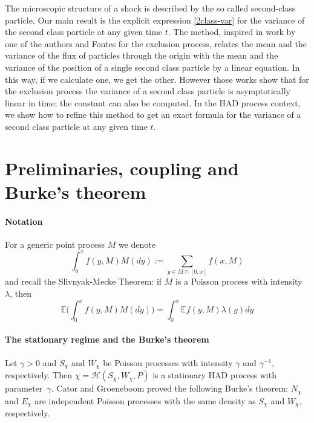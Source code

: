 \documentclass[reqno, 12pt]{amsart}
\begin{document}
The microscopic structure of a shock is described by the so called second-class
particle.  Our main result is the explicit expression \eqref{2class-var} for the
variance of the second class particle at any given time $t$. The method,
inspired in work by one of the authors and Fontes \cite{f,ff} for the exclusion
process, relates the mean and the variance of the flux of particles through the
origin with the mean and the variance of the position of a single second class
particle by a linear equation. In this way, if we calculate one, we get the
other. However those works show that for the exclusion process the variance of a
second class particle is asymptotically linear in time; the constant can also be
computed. In the HAD process context, we show how to refine this method to get
an exact formula for the variance of a second class particle at any given time
$t$.

\section{Preliminaries, coupling and Burke's theorem}
\label{preliminaries}

\paragraph{\bf Notation} For a generic point process $M$ we denote
\begin{equation}
  \label{z1}
  \int_0^x f(y,M) M(dy):= \sum_{y\in M\cap[0,x]} f(x,M)
\end{equation}
and recall the Slivnyak-Mecke Theorem: if $M$ is a Poisson process with
intensity $\lambda$, then
\begin{equation}
  \label{z2}
  {{\mathbb E}} \Big(\int_0^x f(y,M) M(dy)\Big)= \int_0^x {{\mathbb E}} f(y,M) \lambda(y) dy
\end{equation}

\paragraph{\bf The stationary regime and the Burke's theorem} Let $\gamma>0$ and
$S_\chi$ and $W_\chi$ be Poisson processes with intensity $\gamma$ and
$\gamma^{-1}$, respectively. Then $\chi={\mathcal H}(S_\chi,W_\chi,P)$ is a
stationary HAD process with parameter~$\gamma$. Cator and Groeneboom \cite{cg}
proved the following Burke's theorem: $N_\chi$ and $E_\chi$ are independent
Poisson processes with the same density as $S_\chi$ and $W_\chi$, respectively.
\end{document}
